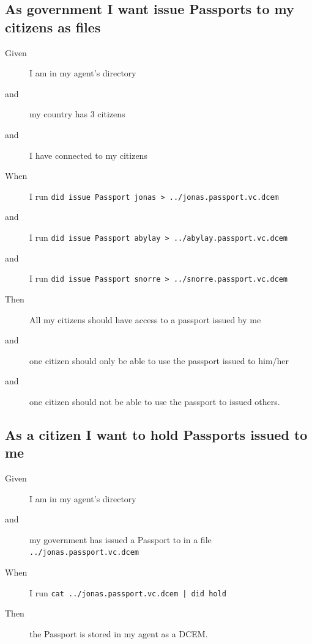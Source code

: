 \subsection{As government I want issue Passports to my citizens as files}
\begin{description}\begin{description}
    \item[Given] I am in my agent's directory
    \item[and] my country has 3 citizens 
    \item[and] I have connected to my citizens
    \item[When] I run \texttt{did issue Passport jonas > ../jonas.passport.vc.dcem}
    \item[and] I run \texttt{did issue Passport abylay > ../abylay.passport.vc.dcem}
    \item[and] I run \texttt{did issue Passport snorre > ../snorre.passport.vc.dcem}
    \item[Then] All my citizens should have access to a passport issued by me
    \item[and] one citizen should only be able to use the passport issued to him/her
    \item[and] one citizen should not be able to use the passport to issued others.
\end{description}\end{description}



\subsection{As a citizen I want to hold Passports issued to me}
\begin{description}\begin{description}
    \item[Given] I am in my agent's directory
    \item[and] my government has issued a Passport to in a file \texttt{../jonas.passport.vc.dcem}
    \item[When] I run \texttt{cat ../jonas.passport.vc.dcem | did hold}
    \item[Then] the Passport is stored in my agent as a DCEM.
\end{description}\end{description}



